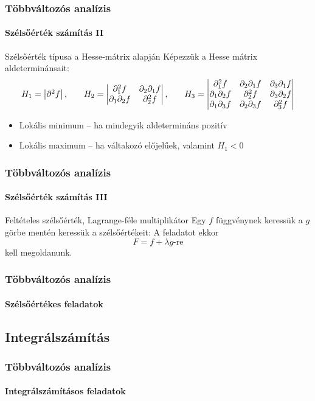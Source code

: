 \begin{frame}
  \frametitle{Többváltozós analízis}
  \framesubtitle{Szélsőérték számítás II}

  \begin{block}{Szélsőérték típusa a Hesse-mátrix alapján}
    Képezzük a Hesse mátrix aldeterminánsait:
    \def\arraystretch{1.25}
    \[
      H_1 = \begin{vmatrix}
        \partial^2 f
      \end{vmatrix}
      \text,
      \mathbf{\qquad}
      H_2 = \begin{vmatrix}
        \partial^2_1 f          & \partial_2 \partial_1 f \\
        \partial_1 \partial_2 f & \partial^2_2 f
      \end{vmatrix}
      \text,
      \qquad
      H_3 = \begin{vmatrix}
        \partial^2_1 f          & \partial_2 \partial_1 f & \partial_3 \partial_1 f \\
        \partial_1 \partial_2 f & \partial^2_2 f          & \partial_3 \partial_2 f \\
        \partial_1 \partial_3 f & \partial_2 \partial_3 f & \partial^2_3 f
      \end{vmatrix}
    \]

    \begin{itemize}
      \item Lokális minimum -- ha mindegyik aldetermináns pozitív
      \item Lokális maximum -- ha váltakozó előjelűek, valamint $H_1 < 0$
    \end{itemize}
  \end{block}
\end{frame}

\begin{frame}
  \frametitle{Többváltozós analízis}
  \framesubtitle{Szélsőérték számítás III}

  \begin{block}{Feltételes szélsőérték, Lagrange-féle multiplikátor}
    Egy $f$ függvénynek keressük a $g$ görbe mentén keressük a szélsőértékeit:
    A feladatot ekkor
    \[
      F = f + \lambda g\text{-re}
    \]
    kell megoldanunk.
  \end{block}
\end{frame}

\begin{frame}
  \frametitle{Többváltozós analízis}
  \framesubtitle{Szélsőértékes feladatok}

  
  
\end{frame}

\subsection{Integrálszámítás}

\begin{frame}
  \frametitle{Többváltozós analízis}
  \framesubtitle{Integrálszámításos feladatok}

  
  
\end{frame}
